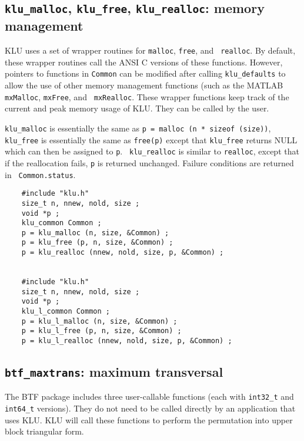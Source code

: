 \documentclass[11pt]{article}
\begin{document}
\subsection{{\tt klu\_malloc}, {\tt klu\_free}, {\tt klu\_realloc}:
memory management}

KLU uses a set of wrapper routines for {\tt malloc}, {\tt free}, and {\tt
realloc}.  By default, these wrapper routines call the ANSI C versions of these
functions.  However, pointers to functions in {\tt Common} can be modified
after calling {\tt klu\_defaults} to allow the use of other memory management
functions (such as the MATLAB {\tt mxMalloc}, {\tt mxFree}, and {\tt
mxRealloc}.  These wrapper functions keep track of the current and peak memory
usage of KLU.  They can be called by the user.

{\tt klu\_malloc} is essentially the same as {\tt p = malloc (n * sizeof
(size))}, {\tt klu\_free} is essentially the same as {\tt free(p)} except that
{\tt klu\_free} returns NULL which can then be assigned to {\tt p}.  {\tt
klu\_realloc} is similar to {\tt realloc}, except that if the reallocation
fails, {\tt p} is returned unchanged.  Failure conditions are returned in {\tt
Common.status}.

{\footnotesize
\begin{verbatim}
    #include "klu.h"
    size_t n, nnew, nold, size ;
    void *p ;
    klu_common Common ;
    p = klu_malloc (n, size, &Common) ;
    p = klu_free (p, n, size, &Common) ;
    p = klu_realloc (nnew, nold, size, p, &Common) ;


    #include "klu.h"
    size_t n, nnew, nold, size ;
    void *p ;
    klu_l_common Common ;
    p = klu_l_malloc (n, size, &Common) ;
    p = klu_l_free (p, n, size, &Common) ;
    p = klu_l_realloc (nnew, nold, size, p, &Common) ;
    \end{verbatim}
}

\subsection{{\tt btf\_maxtrans}: maximum transversal}

The BTF package includes three user-callable functions (each with \verb'int32_t'
and \verb'int64_t' versions).  They do not need to be called directly by an
application that uses KLU.  KLU will call these functions to perform the
permutation into upper block triangular form.
\end{document}
